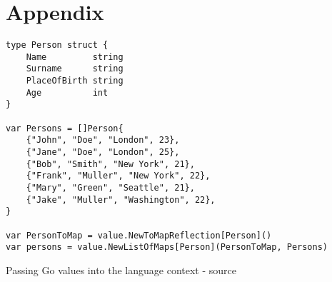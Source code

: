\chapter{Appendix}

\begin{listing}[H]
    \begin{verbatim}
type Person struct {
	Name         string
	Surname      string
	PlaceOfBirth string
	Age          int
}

var Persons = []Person{
	{"John", "Doe", "London", 23},
	{"Jane", "Doe", "London", 25},
	{"Bob", "Smith", "New York", 21},
	{"Frank", "Muller", "New York", 22},
	{"Mary", "Green", "Seattle", 21},
	{"Jake", "Muller", "Washington", 22},
}

var PersonToMap = value.NewToMapReflection[Person]()
var persons = value.NewListOfMaps[Person](PersonToMap, Persons)
    \end{verbatim}
    \caption{Passing Go values into the language context - source \cite{parser2_xnacly}}
    \label{code:go-to-language-interop}
\end{listing}
